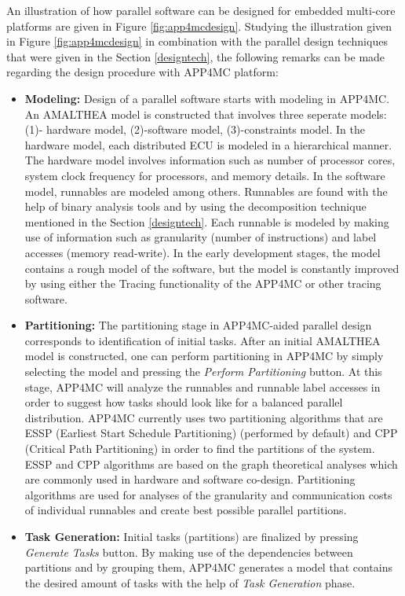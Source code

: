 An illustration of how parallel software can be designed for embedded multi-core platforms are given in Figure \ref{fig:app4mcdesign}. Studying the illustration given in Figure \ref{fig:app4mcdesign} in combination with the parallel design techniques that were given in the Section \ref{designtech}, the following remarks can be made regarding the design procedure with APP4MC platform:
\begin{itemize}
	\item \textbf{Modeling:} Design of a parallel software starts with modeling in APP4MC. An AMALTHEA model is constructed that involves three seperate models: (1)- hardware model, (2)-software model, (3)-constraints model. In the hardware model, each distributed ECU is modeled in a hierarchical  manner. The hardware model involves information such as number of processor cores, system clock frequency for processors, and memory details. In the software model, runnables are modeled among others. Runnables are found with the help of binary analysis tools and by using the decomposition technique mentioned in the Section \ref{designtech}. Each runnable is modeled by making use of information such as granularity (number of instructions) and label accesses (memory read-write). In the early development stages, the model contains a rough model of the software, but the model is constantly improved by using either the Tracing functionality of the APP4MC or other tracing software.
	\item \textbf{Partitioning:} The partitioning stage in APP4MC-aided parallel design corresponds to identification of initial tasks. After an initial AMALTHEA model is constructed, one can perform partitioning in APP4MC by simply selecting the model and pressing the \textit{Perform Partitioning} button. At this stage, APP4MC will analyze the runnables and runnable label accesses in order to suggest how tasks should look like for a balanced parallel distribution. APP4MC currently uses two partitioning algorithms that are ESSP (Earliest Start Schedule Partitioning) (performed by default) and CPP (Critical Path Partitioning) in order to find the partitions of the system. ESSP and CPP algorithms are based on the graph theoretical analyses \cite{graphtheory} which are commonly used in hardware and software co-design. Partitioning algorithms are used for analyses of the granularity and communication costs of individual runnables and create best possible parallel partitions.
	\item \textbf{Task Generation:} Initial tasks (partitions) are finalized by pressing \textit{Generate Tasks} button. By making use of the dependencies between partitions and by grouping them, APP4MC generates a model that contains the desired amount of tasks with the help of \textit{Task Generation} phase. 

\end{itemize}
